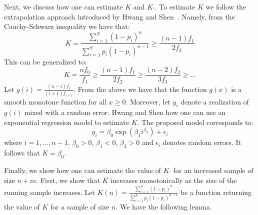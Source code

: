 \documentclass{vldb}
\begin{document}
Next, we discuss how one can estimate $K$ and $K_{\prime}$. To estimate $K$ we follow the extrapolation approach introduced by Hwang and Shen~\cite{hwang:2010}. Namely, from the Cauchy-Schwarz inequality we have that:
\begin{equation}
K = \frac{\sum_{i=1}^S (1-p_i)^n}{\sum_{i=1}^S p_i(1-p_i)^{n-1}} \geq \frac{(n-1)f_1}{2f_2}
\end{equation}
This can be generalized to:
\begin{equation}
K=\frac{nf_0}{f_1} \geq \frac{(n-1)f_1}{2f_2} \geq \frac{(n-2)f_2}{3f_3} \geq \dots
\end{equation}
Let $g(i) = \frac{(n-i)f_i}{(i+1)f_{i+1}}$. From the above we have that the function $g(x)$ is a smooth monotone function for all $x \geq 0$. Moreover, let $y_i$ denote a realization of $g(i)$ mixed with a random error. Hwang and Shen how one can use an exponential regression model to estimate $K$. The proposed model corresponds to:
\begin{equation}
y_i = \beta_0\exp(\beta_1i^{\beta_2}) + \epsilon_i
\end{equation}
where $i = 1, \dots, n-1$, $\beta_0 > 0$, $\beta_1 < 0$, $\beta_2 >0$ and $\epsilon_i$ denotes random errors. It follows that $K = \beta_0$. 

Finally, we show how one can estimate the value of $K_\prime$ for an increased sample of size $n+m$. First, we show that $K$ increases monotonically as the size of the running sample increases. Let $K(n) = \frac{\sum_{i=1}^S (1-p_i)^n}{\sum_{i=1}^S p_i(1-p_i)^{n-1}}$ be a function returning the value of $K$ for a sample of size $n$. We have the following lemma. 
\end{document}
